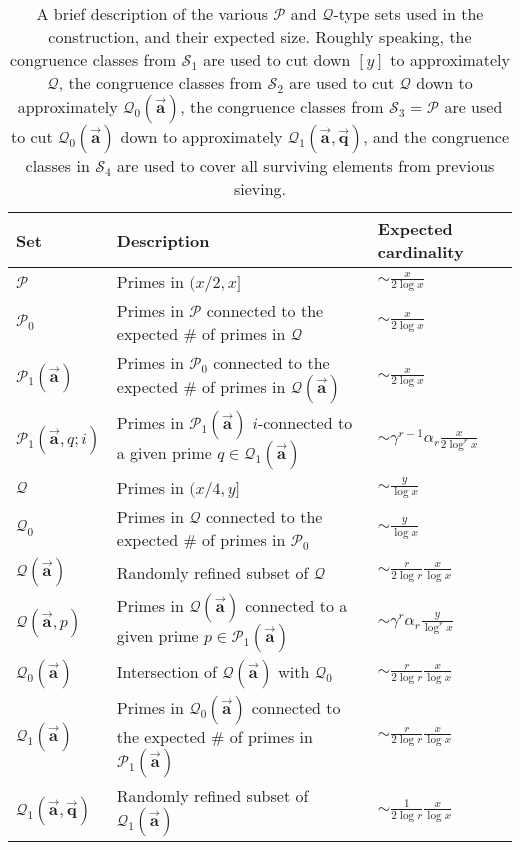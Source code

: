 \documentclass[12pt]{amsart}
\numberwithin{equation}{section}  %
\theoremstyle{remark}
\theoremstyle{plain}
\numberwithin{equation}{section}
\renewcommand{\(}{\left(}
\renewcommand{\)}{\right)}
\newcommand{\asym}{\sim}   %
\newcommand{\vect}[1]{{\ensuremath{\vec{#1}}}}
\newcommand{\PP}{\mathcal{P}}
\newcommand{\QQ}{\mathcal{Q}}
\newcommand{\cS}{\mathcal{S}}
\begin{document}
\begin{table}
\begin{tabular}{|l|l|l|}
\hline
Set & Description & Expected cardinality \\
\hline
$\PP$ & Primes in $(x/2,x]$ & $\asym \frac{x}{2\log x}$ \\
$\PP_0$ & Primes in $\PP$ connected to the expected \# of primes in $\QQ$ & $\asym \frac{x}{2\log x}$\\ 
$\PP_1(\vect{\mathbf{a}})$ & Primes in $\PP_0$ connected to the expected \# of primes in $\QQ(\vect{\mathbf{a}})$ & $\asym \frac{x}{2\log x}$\\
$\PP_1(\vect{\mathbf{a}},q;i)$ & Primes in $\PP_1(\vect{\mathbf{a}})$ $i$-connected to a given prime $q \in \QQ_1(\vect{\mathbf{a}})$ & $\asym \gamma^{r-1} \alpha_r \frac{x}{2\log^r x}$ \\
\hline
$\QQ$ & Primes in $(x/4,y]$ & $\asym \frac{y}{\log x}$ \\
$\QQ_0$ & Primes in $\QQ$ connected to the expected \# of primes in $\PP_0$ & $\asym \frac{y}{\log x}$ \\
$\QQ(\vect{\mathbf{a}})$ & Randomly refined subset of $\QQ$ & $\asym \frac{r}{2\log r} \frac{x}{\log x}$ \\
$\QQ(\vect{\mathbf{a}}, p)$ & Primes in $\QQ(\vect{\mathbf{a}})$ connected to a given prime $p \in \PP_1(\vect{\mathbf{a}})$ & $\asym \gamma^r\alpha_r\frac y{\log^r x}$ \\
$\QQ_0(\vect{\mathbf{a}})$ & Intersection of $\QQ(\vect{\mathbf{a}})$ with $\QQ_0$ & $\asym \frac{r}{2\log r} \frac{x}{\log x}$ \\
$\QQ_1(\vect{\mathbf{a}})$ & Primes in $\QQ_0(\vect{\mathbf{a}})$ connected to the expected \# of primes in $\PP_1(\vect{\mathbf{a}})$ & $\asym \frac{r}{2\log r} \frac{x}{\log x}$ \\
$\QQ_1(\vect{\mathbf{a}},\vect{\mathbf{q}})$ & Randomly refined subset of $\QQ_1(\vect{\mathbf{a}})$ & $\asym \frac{1}{2\log r} \frac{x}{\log x}$\\
\hline
\end{tabular}
\caption{A brief description of the various $\PP$ and $\QQ$-type sets used in the construction, and their expected size.  Roughly speaking, the congruence classes from $\cS_1$ are used to cut down $[y]$ to approximately $\QQ$, the congruence classes from $\cS_2$ are used to cut $\QQ$ down to approximately $\QQ_0(\vect{\mathbf{a}})$, the congruence classes from $\cS_3 = \PP$ are used to cut $\QQ_0(\vect{\mathbf{a}})$ down to approximately $\QQ_1(\vect{\mathbf{a}}, \vect{\mathbf{q}})$, and the congruence classes in $\cS_4$ are used to cover all surviving elements from previous sieving.}
\end{table}
\end{document}
